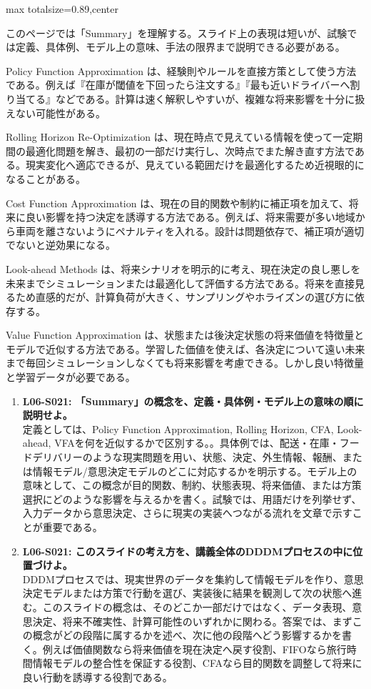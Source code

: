 \begin{minipage}[t]{0.58\textwidth}
\begin{adjustbox}{max totalsize={\textwidth}{0.89\textheight},center}
\begin{minipage}{\textwidth}\scriptsize
{}このページでは「Summary」を理解する。スライド上の表現は短いが、試験では定義、具体例、モデル上の意味、手法の限界まで説明できる必要がある。\par
Policy Function Approximation は、経験則やルールを直接方策として使う方法である。例えば『在庫が閾値を下回ったら注文する』『最も近いドライバーへ割り当てる』などである。計算は速く解釈しやすいが、複雑な将来影響を十分に扱えない可能性がある。\par
Rolling Horizon Re-Optimization は、現在時点で見えている情報を使って一定期間の最適化問題を解き、最初の一部だけ実行し、次時点でまた解き直す方法である。現実変化へ適応できるが、見えている範囲だけを最適化するため近視眼的になることがある。\par
Cost Function Approximation は、現在の目的関数や制約に補正項を加えて、将来に良い影響を持つ決定を誘導する方法である。例えば、将来需要が多い地域から車両を離さないようにペナルティを入れる。設計は問題依存で、補正項が適切でないと逆効果になる。\par
Look-ahead Methods は、将来シナリオを明示的に考え、現在決定の良し悪しを未来までシミュレーションまたは最適化して評価する方法である。将来を直接見るため直感的だが、計算負荷が大きく、サンプリングやホライズンの選び方に依存する。\par
Value Function Approximation は、状態または後決定状態の将来価値を特徴量とモデルで近似する方法である。学習した価値を使えば、各決定について遠い未来まで毎回シミュレーションしなくても将来影響を考慮できる。しかし良い特徴量と学習データが必要である。\par{}\begin{enumerate}\item \textbf{L06-S021: 「Summary」の概念を、定義・具体例・モデル上の意味の順に説明せよ。}\\定義としては、Policy Function Approximation, Rolling Horizon, CFA, Look-ahead, VFAを何を近似するかで区別する。。具体例では、配送・在庫・フードデリバリーのような現実問題を用い、状態、決定、外生情報、報酬、または情報モデル/意思決定モデルのどこに対応するかを明示する。モデル上の意味として、この概念が目的関数、制約、状態表現、将来価値、または方策選択にどのような影響を与えるかを書く。試験では、用語だけを列挙せず、入力データから意思決定、さらに現実の実装へつながる流れを文章で示すことが重要である。\item \textbf{L06-S021: このスライドの考え方を、講義全体のDDDMプロセスの中に位置づけよ。}\\DDDMプロセスでは、現実世界のデータを集約して情報モデルを作り、意思決定モデルまたは方策で行動を選び、実装後に結果を観測して次の状態へ進む。このスライドの概念は、そのどこか一部だけではなく、データ表現、意思決定、将来不確実性、計算可能性のいずれかに関わる。答案では、まずこの概念がどの段階に属するかを述べ、次に他の段階へどう影響するかを書く。例えば価値関数なら将来価値を現在決定へ戻す役割、FIFOなら旅行時間情報モデルの整合性を保証する役割、CFAなら目的関数を調整して将来に良い行動を誘導する役割である。\end{enumerate}

\end{minipage}
\end{adjustbox}
\end{minipage}
